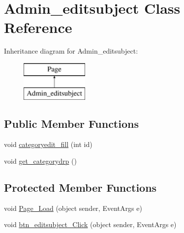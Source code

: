 \hypertarget{class_admin__editsubject}{}\section{Admin\+\_\+editsubject Class Reference}
\label{class_admin__editsubject}
Inheritance diagram for Admin\+\_\+editsubject\+:\begin{figure}[H]
\begin{center}
\leavevmode
\includegraphics[height=2.000000cm]{class_admin__editsubject}
\end{center}
\end{figure}
\subsection*{Public Member Functions}
\begin{DoxyCompactItemize}
\item 
void \mbox{\hyperlink{class_admin__editsubject_a9a30adc3bd2ebfb14a062dbe6c86c9ec}{categoryedit\+\_\+fill}} (int id)
\item 
void \mbox{\hyperlink{class_admin__editsubject_a9e9bf50442707f5526f5256579b3cbbf}{get\+\_\+categorydrp}} ()
\end{DoxyCompactItemize}
\subsection*{Protected Member Functions}
\begin{DoxyCompactItemize}
\item 
void \mbox{\hyperlink{class_admin__editsubject_aaa5fea0d63f06b8adaa85d7ab1f9b730}{Page\+\_\+\+Load}} (object sender, Event\+Args e)
\item 
void \mbox{\hyperlink{class_admin__editsubject_a6c1a3f3dce23357d1fa9ad3d83c2c814}{btn\+\_\+editsubject\+\_\+\+Click}} (object sender, Event\+Args e)
\end{DoxyCompactItemize}
